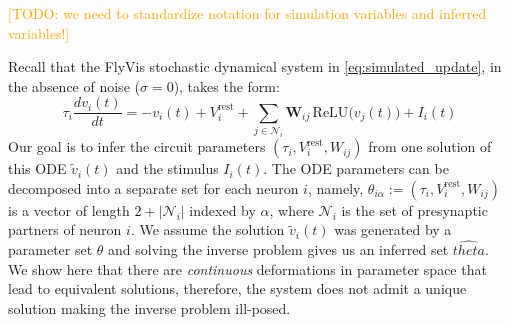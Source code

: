 \documentclass{article}
\newcommand{\comment}[1]{\textcolor{orange}{[#1]}}
\def\vrest{V^{\mathrm{rest}}}
\begin{document}
\comment{TODO: we need to standardize notation for simulation variables and inferred variables!}

Recall that the FlyVis stochastic dynamical system in \ref{eq:simulated_update}, in the absence of noise ($\sigma=0$), takes the form:
\begin{equation}
    \tau_i\frac{dv_i(t)}{dt} = -v_i(t) + V_i^{\text{rest}}
+ \sum_{j\in\mathcal{N}_i}\mathbf{W}_{ij}\,\text{ReLU}\!\big(v_j(t)\big)
+ I_i(t) \label{eq:flyvis-app-noise-free-ode}
\end{equation}
Our goal is to infer the circuit parameters $(\tau_i, \vrest_i, W_{ij})$ from one solution of this ODE $\tilde{v}_i(t)$ and the stimulus $I_i(t)$. The ODE parameters can be decomposed into a separate set for each neuron $i$, namely, $\theta_{i\alpha} := (\tau_i, \vrest_i, W_{ij})$ is a vector of length $2 + |\mathcal{N}_i|$ indexed by $\alpha$, where $\mathcal{N}_i$ is the set of presynaptic partners of neuron $i$. We assume the solution $\tilde{v}_i(t)$ was generated by a parameter set $\theta$ and solving the inverse problem gives us an inferred set $\hat{theta}$. We show here that there are \emph{continuous} deformations in parameter space that lead to equivalent solutions, therefore, the system does not admit a unique solution making the inverse problem ill-posed.
\end{document}

